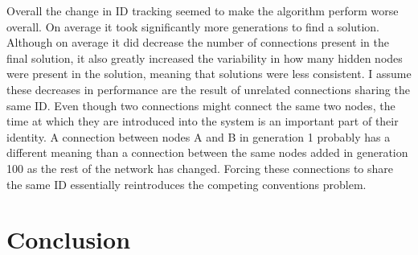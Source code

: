 \documentclass[twocolumn,letterpaper]{article}
\begin{document}
Overall the change in ID tracking seemed to make the algorithm perform worse overall. On average it took significantly more generations to find a solution. Although on average it did decrease the number of
connections present in the final solution, it also greatly increased the variability in how many hidden
nodes were present in the solution, meaning that solutions were less consistent. I assume these decreases in performance are the result of unrelated connections sharing the same ID. Even though two connections might
connect the same two nodes, the time at which they are introduced into the system is an important part of
their identity. A connection between nodes A and B in generation 1 probably has a different meaning than a
connection between the same nodes added in generation 100 as the rest of the network has changed. Forcing
these connections to share the same ID essentially reintroduces the competing conventions problem.

\section{Conclusion} \label{sec:conclusion}


\medskip


\end{document}
